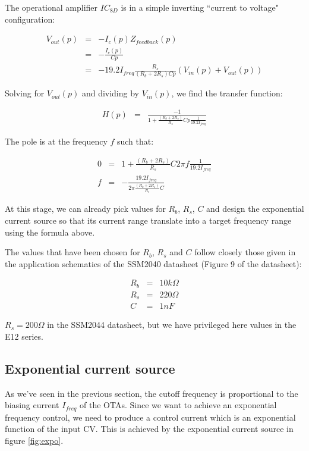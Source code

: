 \documentclass[a4paper,11pt]{article}
\begin{document}
The operational amplifier $IC_{8D}$ is in a simple inverting ``current to voltage" configuration:

\begin{eqnarray}
V_{out}(p) &=& - I_c(p) Z_{feedback}(p) \\
 &=& - \frac{I_c(p)}{Cp} \\
 &=& - 19.2 I_{freq} \frac{R_s}{(R_b + 2 R_s)Cp} (V_{in}(p) + V_{out}(p))
\end{eqnarray}

Solving for $V_{out}(p)$ and dividing by $V_{in}(p)$, we find the transfer function:

\begin{eqnarray}
H(p) &=& \frac{-1}{1 + \frac{(R_b + 2 R_s)}{R_s} Cp \frac{1}{19.2 I_{freq}}}
\end{eqnarray}

The pole is at the frequency $f$ such that:

\begin{eqnarray}
0 &=& 1 + \frac{(R_b + 2 R_s)}{R_s} C 2\pi f \frac{1}{19.2 I_{freq}} \\
f &=& -\frac{19.2 I_{freq}}{2 \pi \frac{(R_b + 2 R_s)}{R_s} C}
\end{eqnarray}

At this stage, we can already pick values for $R_b$, $R_s$, $C$ and design the exponential current source so that its current range translate into a target frequency range using the formula above.

The values that have been chosen for $R_b$, $R_s$ and $C$ follow closely those given in the application schematics of the SSM2040 datasheet (Figure 9 of the datasheet):

\begin{eqnarray*}
R_b &=& 10 k \Omega \\
R_s &=& 220 \Omega \\
C &=& 1 nF
\end{eqnarray*}

$R_s = 200 \Omega$ in the SSM2044 datasheet, but we have privileged here values in the E12 series.

\subsection{Exponential current source}

As we've seen in the previous section, the cutoff frequency is proportional to the biasing current $I_{freq}$ of the OTAs. Since we want to achieve an exponential frequency control, we need to produce a control current which is an exponential function of the input CV. This is achieved by the exponential current source in figure \ref{fig:expo}.
\end{document}
